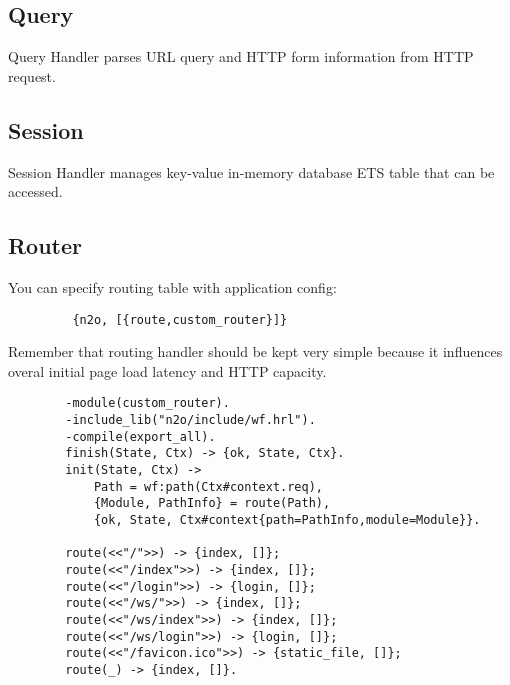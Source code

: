 \subsection{Query}
Query Handler parses URL query and HTTP form information from HTTP request.

\subsection{Session}
Session Handler manages key-value in-memory database ETS table that can be accessed.

\newpage
\subsection{Router}
You can specify routing table with application config:

\vspace{1\baselineskip}
\begin{lstlisting}
         {n2o, [{route,custom_router}]}
\end{lstlisting}
\vspace{1\baselineskip}

Remember that routing handler should be kept very simple because it
influences overal initial page load latency and HTTP capacity.

\vspace{1\baselineskip}
\begin{lstlisting}
        -module(custom_router).
        -include_lib("n2o/include/wf.hrl").
        -compile(export_all).
        finish(State, Ctx) -> {ok, State, Ctx}.
        init(State, Ctx) -> 
            Path = wf:path(Ctx#context.req),
            {Module, PathInfo} = route(Path),
            {ok, State, Ctx#context{path=PathInfo,module=Module}}.

        route(<<"/">>) -> {index, []};
        route(<<"/index">>) -> {index, []};
        route(<<"/login">>) -> {login, []};
        route(<<"/ws/">>) -> {index, []};
        route(<<"/ws/index">>) -> {index, []};
        route(<<"/ws/login">>) -> {login, []};
        route(<<"/favicon.ico">>) -> {static_file, []};
        route(_) -> {index, []}.
\end{lstlisting}
